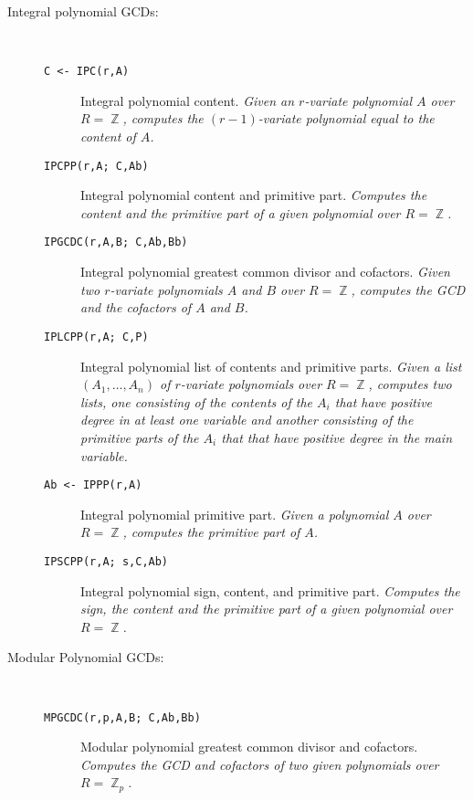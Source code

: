 \begin{description}

\item[Integral polynomial GCDs:] \ \
  \begin{description} 

    \item[{\tt C <- IPC(r,A) 
}] Integral polynomial content. {\em Given an $r$-variate
polynomial $A$ over $R = \BbbZ$, computes the $(r-1)$-variate
polynomial equal to the content of $A$.}

    \item[{\tt  IPCPP(r,A; C,Ab) 
}] Integral polynomial content and primitive part. {\em
Computes the content and the primitive part of a given 
polynomial over $R = \BbbZ$.}

    \item[{\tt  IPGCDC(r,A,B; C,Ab,Bb) 
}] Integral polynomial greatest common divisor and
cofactors. {\em Given two $r$-variate polynomials $A$ and $B$ over $R
= \BbbZ$, computes the GCD and the cofactors of $A$ and $B$.}

    \item[{\tt  IPLCPP(r,A; C,P) 
}] Integral polynomial list of contents and primitive
parts. {\em Given a list $(A_1,\ldots,A_n)$ of $r$-variate polynomials
over $R = \BbbZ$, computes two lists, one consisting of the contents
of the $A_i$ that have positive degree in at least one variable and
another consisting of the primitive parts of the $A_i$ that that have
positive degree in the main variable.}

    \item[{\tt Ab <- IPPP(r,A) 
}] Integral polynomial primitive part. {\em Given a
polynomial $A$ over $R = \BbbZ$, computes the primitive part of $A$.}

    \item[{\tt  IPSCPP(r,A; s,C,Ab) 
}] Integral polynomial sign, content, and primitive
part. {\em Computes the sign, the content and the primitive part of a
given polynomial over $R = \BbbZ$.}

\end{description}

\item[Modular Polynomial GCDs:] \ \
  \begin{description}

    \item[{\tt  MPGCDC(r,p,A,B; C,Ab,Bb) 
}] Modular polynomial greatest common divisor and
cofactors.  {\em Computes the GCD and cofactors of two given
polynomials over $R = \BbbZ_p$.}


\end{description}
\end{description}

